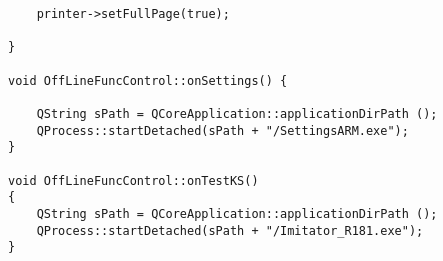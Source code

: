\begin{verbatim}
	printer->setFullPage(true);

}

void OffLineFuncControl::onSettings() {

	QString sPath = QCoreApplication::applicationDirPath ();
	QProcess::startDetached(sPath + "/SettingsARM.exe");
}

void OffLineFuncControl::onTestKS()
{
	QString sPath = QCoreApplication::applicationDirPath ();
	QProcess::startDetached(sPath + "/Imitator_R181.exe");
}
\end{verbatim}
\clearpage
